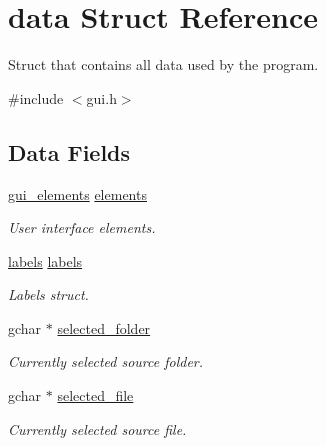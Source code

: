 \hypertarget{structdata}{}\section{data Struct Reference}
\label{structdata}


Struct that contains all data used by the program.  




{\ttfamily \#include $<$gui.\+h$>$}

\subsection*{Data Fields}
\begin{DoxyCompactItemize}
\item 
\mbox{\label{structdata_a8796881586bc014d5de07ee52710d294}} 
\hyperlink{structgui__elements}{gui\+\_\+elements} \hyperlink{structdata_a8796881586bc014d5de07ee52710d294}{elements}
\begin{DoxyCompactList}\small\item\em User interface elements. \end{DoxyCompactList}\item 
\mbox{\label{structdata_ac176635d15519b1a57f3b82372daf133}} 
\hyperlink{structlabels}{labels} \hyperlink{structdata_ac176635d15519b1a57f3b82372daf133}{labels}
\begin{DoxyCompactList}\small\item\em Labels struct. \end{DoxyCompactList}\item 
\mbox{\label{structdata_a58b1e0986c83dbcf18c01d6af17cab41}} 
gchar $\ast$ \hyperlink{structdata_a58b1e0986c83dbcf18c01d6af17cab41}{selected\+\_\+folder}
\begin{DoxyCompactList}\small\item\em Currently selected source folder. \end{DoxyCompactList}\item 
\mbox{\label{structdata_ad099da79a58221e567fa64c152c30945}} 
gchar $\ast$ \hyperlink{structdata_ad099da79a58221e567fa64c152c30945}{selected\+\_\+file}
\begin{DoxyCompactList}\small\item\em Currently selected source file. \end{DoxyCompactList}\item 

\end{DoxyCompactItemize}
